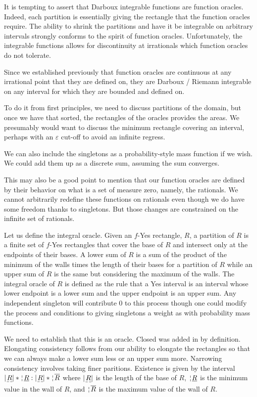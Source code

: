 \documentclass[12pt]{article}
\begin{document}
It is tempting to assert that Darboux integrable functions are function oracles. Indeed, each partition is essentially giving the rectangle that the function oracles require. The ability to shrink the partitions and have it be integrable on arbitrary intervals strongly conforms to the spirit of function oracles. Unfortunately, the integrable functions allows for discontinuity at irrationals which function oracles do not tolerate. 

Since we established previously that function oracles are continuous at any irrational point that they are defined on, they are Darboux / Riemann integrable on any interval for which they are bounded and defined on. 

To do it from first principles, we need to discuss partitions of the domain, but once we have that sorted, the rectangles of the oracles provides the areas. We presumably would want to discuss the minimum rectangle covering an interval, perhaps with an $\varepsilon$ cut-off to avoid an infinite regress. 

We can also include the singletons as a probability-style mass function if we wish. We could add them up as a discrete sum, assuming the sum converges. 

This may also be a good point to mention that our function oracles are defined by their behavior on what is a set of measure zero, namely, the rationals. We cannot arbitrarily redefine these functions on rationals even though we do have some freedom thanks to singletons. But those changes are constrained on the infinite set of rationals. 

Let us define the integral oracle. Given an $f$-Yes rectangle, $R$, a partition of $R$ is a finite set of $f$-Yes rectangles that cover the base of $R$ and intersect only at the endpoints of their bases. A lower sum of $R$ is a sum of the product of the minimum of the walls times the length of their bases for a partition of $R$ while an upper sum of $R$ is the same but considering the maximum of the walls. The integral oracle of $R$ is defined as the rule that a Yes interval is an interval whose lower endpoint is a lower sum and the upper endpoint is an upper sum. Any independent singleton will contribute 0 to this process though one could modify the process and conditions to giving singletons a weight as with probability mass functions. 

We need to establish that this is an oracle. Closed was added in by definition. Elongating consistency follows from our ability to elongate the rectangles so that we can always make a lower sum less or an upper sum more. Narrowing consistency involves taking finer paritions. Existence is given by the interval $|\base{R}|*\wall{\underline{R}}: |\base{R}|*\wall{\overline{R}}$ where $|\base{R}|$ is the length of the base of $R$, $\wall{\underline{R}}$ is the minimum value in the wall of $R$, and $\wall{\overline{R}}$ is the maximum value of the wall of $R$. 
\end{document}
